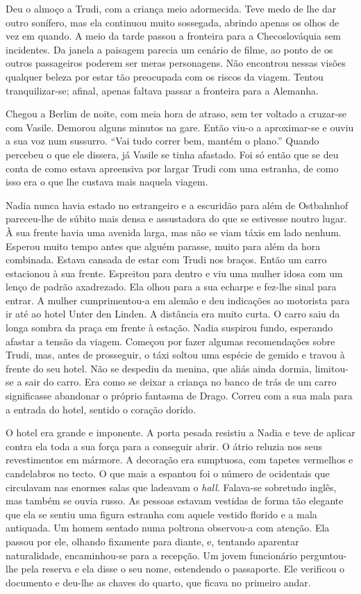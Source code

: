 Deu o almoço a Trudi, com a criança meio adormecida. Teve medo de lhe
dar outro sonífero, mas ela continuou muito sossegada, abrindo apenas os
olhos de vez em quando. A meio da tarde passou a fronteira para a Checoslováquia sem incidentes. Da janela a paisagem parecia um cenário de
filme, ao ponto de os outros passageiros poderem ser meras personagens.
Não encontrou nessas visões qualquer beleza por estar tão preocupada com
os riscos da viagem. Tentou tranquilizar-se; afinal, apenas faltava
passar a fronteira para a Alemanha.

Chegou a Berlim de noite, com meia hora de atraso, sem ter voltado a
cruzar-se com Vasile. Demorou alguns minutos na gare. Então viu-o a
aproximar-se e ouviu a sua voz num sussurro. ``Vai tudo correr bem,
mantém o plano.'' Quando percebeu o que ele dissera, já Vasile se tinha
afastado. Foi só então que se deu conta de como estava apreensiva
por largar Trudi com uma estranha, de como isso era o que lhe custava
mais naquela viagem.

Nadia nunca havia estado no estrangeiro e a escuridão para além de
Ostbahnhof pareceu-lhe de súbito mais densa e assustadora do que se
estivesse noutro lugar. À sua frente havia uma avenida larga, mas não se
viam táxis em lado nenhum. Esperou muito tempo antes que alguém parasse,
muito para além da hora combinada. Estava cansada de estar com Trudi nos
braços. Então um carro estacionou à sua frente. Espreitou para dentro e
viu uma mulher idosa com um lenço de padrão axadrezado. Ela olhou para a
sua echarpe e fez-lhe sinal para entrar. A mulher cumprimentou-a em
alemão e deu indicações ao motorista para ir até ao hotel Unter den
Linden. A distância era muito curta. O carro saiu da longa sombra da
praça em frente à estação. Nadia suspirou fundo, esperando afastar a
tensão da viagem. Começou por fazer algumas recomendações sobre Trudi,
mas, antes de prosseguir, o táxi soltou uma espécie de gemido e travou à
frente do seu hotel. Não se despediu da menina, que aliás ainda dormia,
limitou-se a sair do carro. Era como se deixar a criança no banco de
trás de um carro significasse abandonar o próprio fantasma de Drago.
Correu com a sua mala para a entrada do hotel, sentido o coração dorido.

O hotel era grande e imponente. A porta pesada resistiu
a Nadia e teve de aplicar contra ela toda a sua força para a conseguir
abrir. O átrio reluzia nos seus revestimentos em mármore. A decoração
era sumptuosa, com tapetes vermelhos e candelabros no tecto. O que mais
a espantou foi o número de ocidentais que circulavam nas enormes salas
que ladeavam o \emph{hall}. Falava-se sobretudo inglês, mas também se
ouvia russo. As pessoas estavam vestidas de
forma tão elegante que ela se sentiu uma figura estranha com aquele
vestido florido e a mala antiquada. Um homem sentado numa poltrona
observou-a com atenção. Ela passou por ele, olhando fixamente para
diante, e, tentando aparentar naturalidade, encaminhou-se para a
recepção. Um jovem funcionário perguntou-lhe pela reserva e ela disse o
seu nome, estendendo o passaporte. Ele verificou o documento e deu-lhe
as chaves do quarto, que ficava no primeiro andar.

